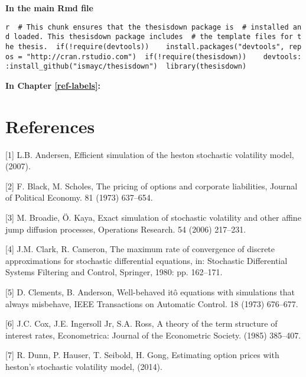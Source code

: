 \documentclass[12pt,twoside]{reedthesis}
\theoremstyle{definition}
\theoremstyle{definition}
\theoremstyle{remark}
\begin{document}
  \textbf{In the main Rmd file}
  
  \texttt{r\ \ \#\ This\ chunk\ ensures\ that\ the\ thesisdown\ package\ is\ \ \#\ installed\ and\ loaded.\ This\ thesisdown\ package\ includes\ \ \#\ the\ template\ files\ for\ the\ thesis.\ \ if(!require(devtools))\ \ \ \ install.packages("devtools",\ repos\ =\ "http://cran.rstudio.com")\ \ if(!require(thesisdown))\ \ \ \ devtools::install\_github("ismayc/thesisdown")\ \ library(thesisdown)}
  
  \textbf{In Chapter \ref{ref-labels}:}
  
  \backmatter
  
  \chapter*{References}\label{references}
  
  \noindent
  
  \setlength{\parindent}{-0.20in} \setlength{\leftskip}{0.20in}
  \setlength{\parskip}{8pt}
  
  \hypertarget{refs}{}
  \hypertarget{ref-andersen}{}
  {[}1{]} L.B. Andersen, Efficient simulation of the heston stochastic
  volatility model, (2007).
  
  \hypertarget{ref-black1973pricing}{}
  {[}2{]} F. Black, M. Scholes, The pricing of options and corporate
  liabilities, Journal of Political Economy. 81 (1973) 637--654.
  
  \hypertarget{ref-broadie2006exact}{}
  {[}3{]} M. Broadie, Ö. Kaya, Exact simulation of stochastic volatility
  and other affine jump diffusion processes, Operations Research. 54
  (2006) 217--231.
  
  \hypertarget{ref-clark1980maximum}{}
  {[}4{]} J.M. Clark, R. Cameron, The maximum rate of convergence of
  discrete approximations for stochastic differential equations, in:
  Stochastic Differential Systems Filtering and Control, Springer, 1980:
  pp. 162--171.
  
  \hypertarget{ref-clements1973well}{}
  {[}5{]} D. Clements, B. Anderson, Well-behaved itô equations with
  simulations that always misbehave, IEEE Transactions on Automatic
  Control. 18 (1973) 676--677.
  
  \hypertarget{ref-cox1985theory}{}
  {[}6{]} J.C. Cox, J.E. Ingersoll Jr, S.A. Ross, A theory of the term
  structure of interest rates, Econometrica: Journal of the Econometric
  Society. (1985) 385--407.
  
  \hypertarget{ref-dunn2014estimating}{}
  {[}7{]} R. Dunn, P. Hauser, T. Seibold, H. Gong, Estimating option
  prices with heston's stochastic volatility model, (2014).
  
\end{document}
